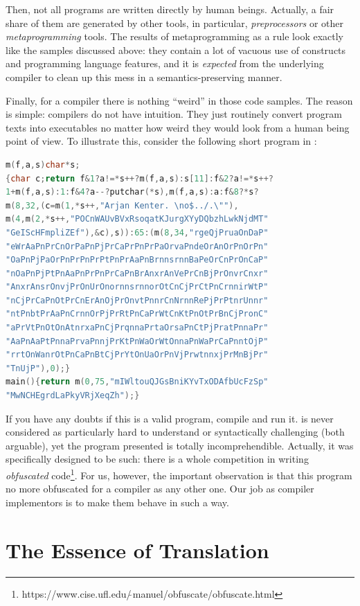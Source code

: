 Then, not all programs are written directly by human beings. Actually, a fair share of them are generated by other tools, in particular, \emph{preprocessors}
or other \emph{metaprogramming} tools. The results of metaprogramming as a rule look exactly like the samples discussed above: they contain a lot
of vacuous use of constructs and programming language features, and it is \emph{expected} from the underlying compiler to clean up this mess
in a semantics-preserving manner.

Finally, for a compiler there is nothing ``weird'' in those code samples. The reason is simple: compilers do not have intuition. They just 
routinely convert program texts into executables no matter how weird they would look from a human being point of view. To illustrate this,
consider the following short program in : 

\begin{lstlisting}[language=cc]
m(f,a,s)char*s;
{char c;return f&1?a!=*s++?m(f,a,s):s[11]:f&2?a!=*s++?
1+m(f,a,s):1:f&4?a--?putchar(*s),m(f,a,s):a:f&8?*s?
m(8,32,(c=m(1,*s++,"Arjan Kenter. \no$../.\""),
m(4,m(2,*s++,"POCnWAUvBVxRsoqatKJurgXYyDQbzhLwkNjdMT"
"GeIScHFmpliZEf"),&c),s)):65:(m(8,34,"rgeQjPruaOnDaP"
"eWrAaPnPrCnOrPaPnPjPrCaPrPnPrPaOrvaPndeOrAnOrPnOrPn"
"OaPnPjPaOrPnPrPnPrPtPnPrAaPnBrnnsrnnBaPeOrCnPrOnCaP"
"nOaPnPjPtPnAaPnPrPnPrCaPnBrAnxrAnVePrCnBjPrOnvrCnxr"
"AnxrAnsrOnvjPrOnUrOnornnsrnnorOtCnCjPrCtPnCrnnirWtP"
"nCjPrCaPnOtPrCnErAnOjPrOnvtPnnrCnNrnnRePjPrPtnrUnnr"
"ntPnbtPrAaPnCrnnOrPjPrRtPnCaPrWtCnKtPnOtPrBnCjPronC"
"aPrVtPnOtOnAtnrxaPnCjPrqnnaPrtaOrsaPnCtPjPratPnnaPr"
"AaPnAaPtPnnaPrvaPnnjPrKtPnWaOrWtOnnaPnWaPrCaPnntOjP"
"rrtOnWanrOtPnCaPnBtCjPrYtOnUaOrPnVjPrwtnnxjPrMnBjPr"
"TnUjP"),0);}
main(){return m(0,75,"mIWltouQJGsBniKYvTxODAfbUcFzSp"
"MwNCHEgrdLaPkyVRjXeqZh");}
\end{lstlisting}

If you have any doubts if this is a valid  program, compile and run it.  is never considered as particularly hard to
understand or syntactically challenging (both arguable), yet the program presented is totally incomprehendible. Actually, it
was specifically designed to be such: there is a whole competition in writing \emph{obfuscated}
code\footnote{https://www.cise.ufl.edu/$\tilde\,$manuel/obfuscate/obfuscate.html}. For us, however, the important observation is that this
program no more obfuscated for a compiler as any other one. Our job as compiler implementors is to make them behave in such a way.


\section{The Essence of Translation}


